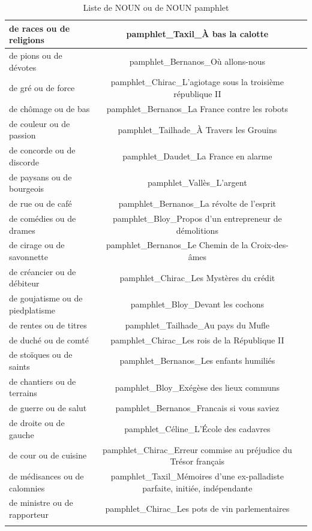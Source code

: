 \begin{longtable}{| p{12.5cm}| c | c| }
        \hline
        de races ou de religions & pamphlet\_Taxil\_À bas la calotte \\
        \hline
        de pions ou de dévotes & pamphlet\_Bernanos\_Où allons-nous \\
        \hline
        de gré ou de force & pamphlet\_Chirac\_L'agiotage sous la troisième république II \\
        \hline
        de chômage ou de bas & pamphlet\_Bernanos\_La France contre les robots \\
        \hline
        de couleur ou de passion & pamphlet\_Tailhade\_À Travers les Grouins \\
        \hline
        de concorde ou de discorde & pamphlet\_Daudet\_La France en alarme \\
        \hline
        de paysans ou de bourgeois & pamphlet\_Vallès\_L'argent \\
        \hline
        de rue ou de café & pamphlet\_Bernanos\_La révolte de l'esprit \\
        \hline
        de comédies ou de drames & pamphlet\_Bloy\_Propos d’un entrepreneur de démolitions \\
        \hline
        de cirage ou de savonnette & pamphlet\_Bernanos\_Le Chemin de la Croix-des-âmes \\
        \hline
        de créancier ou de débiteur & pamphlet\_Chirac\_Les Mystères du crédit \\
        \hline
        de goujatisme ou de piedplatisme & pamphlet\_Bloy\_Devant les cochons \\
        \hline
        de rentes ou de titres & pamphlet\_Tailhade\_Au pays du Mufle \\
        \hline
        de duché ou de comté & pamphlet\_Chirac\_Les rois de la République II \\
        \hline
        de stoïques ou de saints & pamphlet\_Bernanos\_Les enfants humiliés  \\
        \hline
        de chantiers ou de terrains & pamphlet\_Bloy\_Exégèse des lieux communs \\
        \hline
        de guerre ou de salut & pamphlet\_Bernanos\_Francais si vous saviez \\
        \hline
        de droite ou de gauche & pamphlet\_Céline\_L'École des cadavres \\
        \hline
        de cour ou de cuisine & pamphlet\_Chirac\_Erreur commise au préjudice du Trésor français \\
        \hline
        de médisances ou de calomnies & pamphlet\_Taxil\_Mémoires d’une ex-palladiste parfaite, initiée, indépendante \\
        \hline
        de ministre ou de rapporteur & pamphlet\_Chirac\_Les pots de vin parlementaires \\
        \hline
    \caption{Liste de NOUN ou de NOUN pamphlet}
    \label{'tab:NOUNoudeNOUN'}
\end{longtable}


